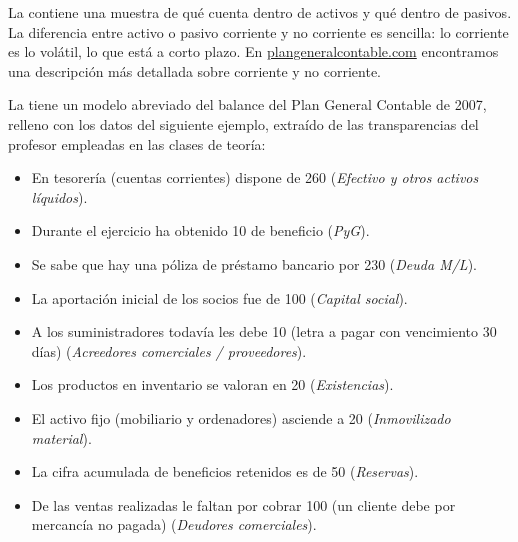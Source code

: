 \documentclass[nochap,palatino,shortheader]{apuntes}
\begin{document}
La  contiene una muestra de qué cuenta dentro de activos y qué dentro de pasivos. La diferencia entre activo o pasivo corriente y no corriente es sencilla: lo corriente es lo volátil, lo que está a corto plazo.
En \href{http://www.plangeneralcontable.com/?tit=guia-del-pgc-de-pymes&name=GeTia&contentId=man_pgcpym&lastCtg=ctg_13&manPage=25}{plangeneralcontable.com} encontramos una descripción más detallada sobre corriente y no corriente.

La  tiene un modelo abreviado del balance del Plan General Contable de 2007, relleno con los datos del siguiente ejemplo, extraído de las transparencias del profesor empleadas en las clases de teoría:

\begin{itemize}
\item En tesorería (cuentas corrientes) dispone de 260 (\textit{Efectivo y otros activos líquidos}).
\item Durante el ejercicio ha obtenido 10 de beneficio (\textit{PyG}).
\item Se sabe que hay una póliza de préstamo bancario por 230 (\textit{Deuda M/L}).
\item La aportación inicial de los socios fue de 100 (\textit{Capital social}).
\item A los suministradores todavía les debe 10 (letra a pagar con vencimiento 30 días) (\textit{Acreedores comerciales / proveedores}).
\item Los productos en inventario se valoran en 20 (\textit{Existencias}).
\item El activo fijo (mobiliario y ordenadores) asciende a 20 (\textit{Inmovilizado material}).
\item La cifra acumulada de beneficios retenidos es de 50 (\textit{Reservas}).
\item De las ventas realizadas le faltan por cobrar 100 (un cliente debe por mercancía no pagada) (\textit{Deudores comerciales}).
\end{itemize}
\end{document}
